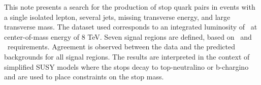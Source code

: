 
This note presents a search for the production of stop quark pairs in events with a 
single isolated lepton, several jets, missing transverse energy, and
large transverse mass. The dataset used corresponds to an integrated
luminosity of \lumi\ at center-of-mass energy of 8 TeV. Seven signal
regions are defined, based on \met\ and \mt\ requirements. Agreement is
observed between the data and the predicted backgrounds for all signal
regions. The results are interpreted in the context of simplified SUSY
models where the stops decay to top-neutralino or b-chargino and are
used to place constraints on the stop mass.
